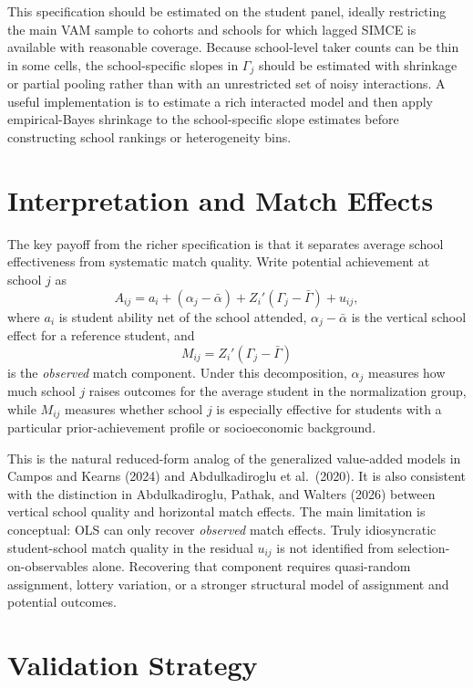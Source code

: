 \documentclass[11pt]{article}
\begin{document}
This specification should be estimated on the student panel, ideally restricting the main VAM sample to cohorts and schools for which lagged SIMCE is available with reasonable coverage. Because school-level taker counts can be thin in some cells, the school-specific slopes in $\Gamma_j$ should be estimated with shrinkage or partial pooling rather than with an unrestricted set of noisy interactions. A useful implementation is to estimate a rich interacted model and then apply empirical-Bayes shrinkage to the school-specific slope estimates before constructing school rankings or heterogeneity bins.

\section*{Interpretation and Match Effects}

The key payoff from the richer specification is that it separates average school effectiveness from systematic match quality. Write potential achievement at school $j$ as
\[
A_{ij} = a_i + (\alpha_j - \bar{\alpha}) + Z_i'(\Gamma_j - \bar{\Gamma}) + u_{ij},
\]
where $a_i$ is student ability net of the school attended, $\alpha_j - \bar{\alpha}$ is the vertical school effect for a reference student, and
\[
M_{ij} = Z_i'(\Gamma_j - \bar{\Gamma})
\]
is the \emph{observed} match component. Under this decomposition, $\alpha_j$ measures how much school $j$ raises outcomes for the average student in the normalization group, while $M_{ij}$ measures whether school $j$ is especially effective for students with a particular prior-achievement profile or socioeconomic background.

This is the natural reduced-form analog of the generalized value-added models in Campos and Kearns (2024) and Abdulkadiroglu et al.\ (2020). It is also consistent with the distinction in Abdulkadiroglu, Pathak, and Walters (2026) between vertical school quality and horizontal match effects. The main limitation is conceptual: OLS can only recover \emph{observed} match effects. Truly idiosyncratic student-school match quality in the residual $u_{ij}$ is not identified from selection-on-observables alone. Recovering that component requires quasi-random assignment, lottery variation, or a stronger structural model of assignment and potential outcomes.

\section*{Validation Strategy}
\end{document}
